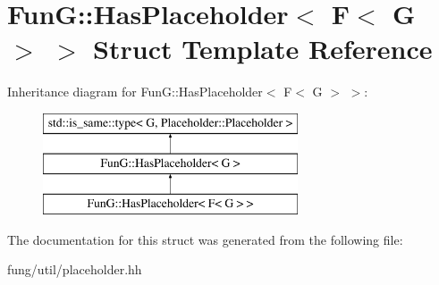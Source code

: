 \hypertarget{structFunG_1_1HasPlaceholder_3_01F_3_01G_01_4_01_4}{\section{Fun\-G\-:\-:Has\-Placeholder$<$ F$<$ G $>$ $>$ Struct Template Reference}
\label{structFunG_1_1HasPlaceholder_3_01F_3_01G_01_4_01_4}
}
Inheritance diagram for Fun\-G\-:\-:Has\-Placeholder$<$ F$<$ G $>$ $>$\-:\begin{figure}[H]
\begin{center}
\leavevmode
\includegraphics[height=3.000000cm]{structFunG_1_1HasPlaceholder_3_01F_3_01G_01_4_01_4}
\end{center}
\end{figure}


The documentation for this struct was generated from the following file\-:\begin{DoxyCompactItemize}
\item 
fung/util/placeholder.\-hh\end{DoxyCompactItemize}
